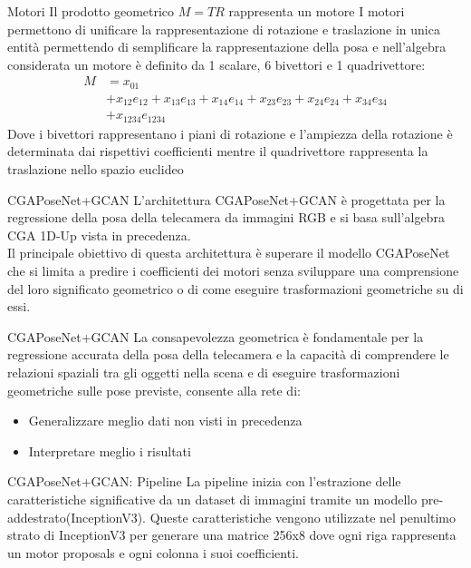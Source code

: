 \begin{frame}{Motori}
   Il prodotto geometrico \(M= TR\) rappresenta un motore
   I motori permettono di unificare la rappresentazione di rotazione e traslazione in unica entità permettendo di semplificare la rappresentazione della posa e nell’algebra considerata un motore è definito da 1 scalare, 6 bivettori e 1 quadrivettore:
   \begin{align*}
      M &= x_{01} \\
          &+ x_{12}e_{12}
          + x_{13}e_{13}
          + x_{14}e_{14} 
          + x_{23}e_{23} 
          + x_{24}e_{24} 
          + x_{34}e_{34} \\
          & + x_{1234}e_{1234}
      \end{align*}
      Dove i bivettori rappresentano i piani di rotazione e l'ampiezza della rotazione è determinata dai rispettivi coefficienti mentre il quadrivettore rappresenta la traslazione nello spazio euclideo
\end{frame}

\begin{frame}{CGAPoseNet+GCAN}
   L’architettura CGAPoseNet+GCAN è progettata per la regressione della posa della telecamera da immagini RGB e si basa sull’algebra CGA 1D-Up vista in precedenza. 
   \\Il principale obiettivo di questa architettura è superare il modello CGAPoseNet che si limita a predire i coefficienti dei motori senza sviluppare  una comprensione del loro significato geometrico o di come eseguire trasformazioni geometriche su di essi.
\end{frame}

\begin{frame}{CGAPoseNet+GCAN }
   La consapevolezza geometrica è fondamentale per la regressione accurata della posa della telecamera e la capacità di comprendere le relazioni spaziali tra gli oggetti nella scena e di eseguire trasformazioni geometriche sulle pose previste, consente alla rete di:
   \begin{itemize}
      \item Generalizzare meglio dati non visti in precedenza
      \item Interpretare meglio i risultati
   \end{itemize}
\end{frame}

\begin{frame}{CGAPoseNet+GCAN: Pipeline}
   La pipeline inizia con l’estrazione delle caratteristiche significative da un dataset di immagini tramite un modello pre-addestrato(InceptionV3). Queste caratteristiche vengono utilizzate nel penultimo strato di InceptionV3 per generare  una matrice 256x8 dove ogni riga rappresenta un motor proposals e ogni colonna i suoi coefficienti.
   
\end{frame}
